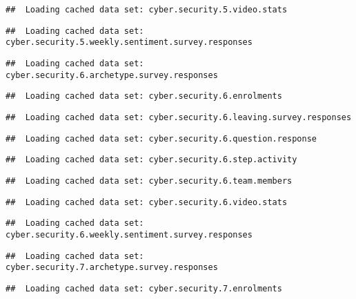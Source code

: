 \documentclass[]{article}
\begin{document}
\begin{verbatim}
##  Loading cached data set: cyber.security.5.video.stats
\end{verbatim}

\begin{verbatim}
##  Loading cached data set: cyber.security.5.weekly.sentiment.survey.responses
\end{verbatim}

\begin{verbatim}
##  Loading cached data set: cyber.security.6.archetype.survey.responses
\end{verbatim}

\begin{verbatim}
##  Loading cached data set: cyber.security.6.enrolments
\end{verbatim}

\begin{verbatim}
##  Loading cached data set: cyber.security.6.leaving.survey.responses
\end{verbatim}

\begin{verbatim}
##  Loading cached data set: cyber.security.6.question.response
\end{verbatim}

\begin{verbatim}
##  Loading cached data set: cyber.security.6.step.activity
\end{verbatim}

\begin{verbatim}
##  Loading cached data set: cyber.security.6.team.members
\end{verbatim}

\begin{verbatim}
##  Loading cached data set: cyber.security.6.video.stats
\end{verbatim}

\begin{verbatim}
##  Loading cached data set: cyber.security.6.weekly.sentiment.survey.responses
\end{verbatim}

\begin{verbatim}
##  Loading cached data set: cyber.security.7.archetype.survey.responses
\end{verbatim}

\begin{verbatim}
##  Loading cached data set: cyber.security.7.enrolments
\end{verbatim}
\end{document}
